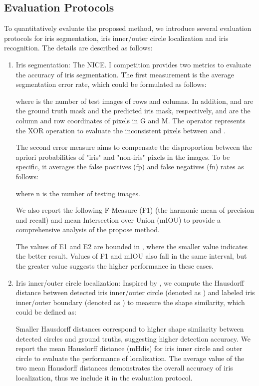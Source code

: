 \documentclass[journal]{IEEEtran}
\begin{document}
\subsection{Evaluation Protocols}
\label{sec::evaluation}
To quantitatively evaluate the proposed method, we introduce several evaluation protocols for iris segmentation, iris inner/outer circle localization and iris recognition. The details are described as follows:
\begin{enumerate}
  \item Iris segmentation: The NICE. I competition\cite{nice1} provides two metrics to evaluate the accuracy of iris segmentation. The first measurement is the average segmentation error rate, which could be formulated as follows:

   where  is the number of test images of  rows and  columns. In addition,  and  are the ground truth mask and the predicted iris mask, respectively, and  are the column and row coordinates of pixels in G and M. The operator  represents the XOR operation to evaluate the inconsistent pixels between  and .

\quad The second error measure aims to compensate the disproportion between the apriori probabilities of "iris" and "non-iris" pixels in the images. To be specific, it averages the false positives (fp) and false negatives (fn) rates as follows:

  where n is the number of testing images.

\quad We also report the following F-Measure (F1) (the harmonic mean of precision and recall)\cite{hofbauer2014ground} and mean Intersection over Union (mIOU) to provide a comprehensive analysis of the propose method.

\quad The values of E1 and E2 are bounded in , where the smaller value indicates the better result. Values of F1 and mIOU also fall in the same interval, but the greater value suggests the higher performance in these cases.

  \item Iris inner/outer circle localization: Inspired by \cite{sirinukunwattana2017gland}, we compute the Hausdorff distance between detected iris inner/outer circle (denoted as ) and labeled iris inner/outer boundary (denoted as ) to measure the shape similarity, which could be defined as:
      
      \quad Smaller Hausdorff distances correspond to higher shape similarity between detected circles and ground truths, suggesting higher detection accuracy.  We report the mean Hausdorff distance (mHdis) for iris inner circle and outer circle to evaluate the performance of localization.
      The average value of the two mean Hausdorff distances demonstrates the overall accuracy of iris localization, thus we include it in the evaluation protocol.


\end{enumerate}
\end{document}
